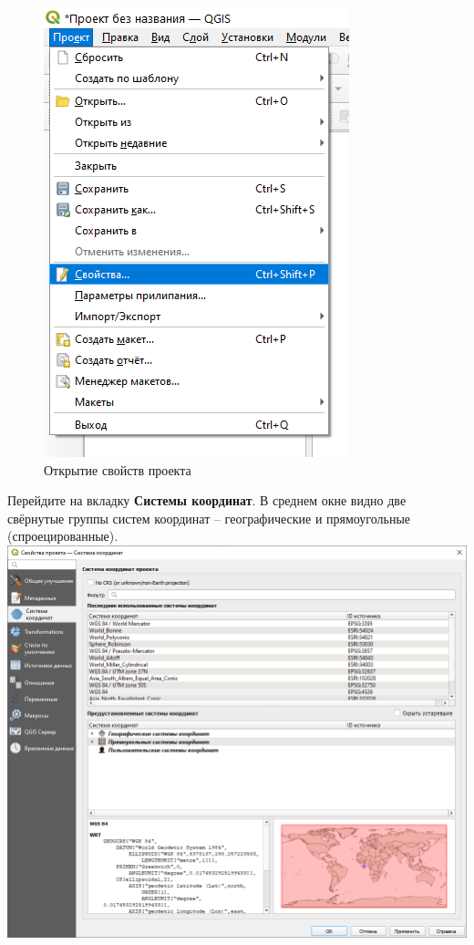 \documentclass[
  12pt,
]{book}
\begin{document}
\begin{figure}
\centering
\includegraphics{images/Georeference/Project_properties.png}
\caption{Открытие свойств проекта}
\end{figure}

Перейдите на вкладку \textbf{Системы координат}. В среднем окне видно две свёрнутые группы систем координат -- географические и прямоугольные (спроецированные).
\includegraphics{images/Georeference/Reference_systems_default.png}
\end{document}
